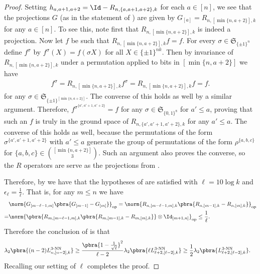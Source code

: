 \begin{proof}
    Setting $h_{a,a+1,a+2}=\Id-R_{n,\{a,a+1,a+2\},k}$ for each $a\in [n]$, we see that the projections $G$ (as in the statement of ) are given by $G_{[a]}=R_{n,[\min\{n,a+2\}],k}$ for any $a\in[n]$. To see this, note first that $R_{n,[\min\{n,a+2\}],k}$ is indeed a projection. Now let $f$ be such that $R_{n,[\min\{n,a+2\}],k}f=f$. For every $\sigma\in \mathfrak{S}_{\{\pm1\}^{n}}$ define $f^\sigma$ by $f^\sigma(X)=f(\sigma X)$ for all $X\in\{\pm1\}^{nk}$. Then by invariance of $R_{n,[\min\{n,a+2\}],k}$ under a permutation applied to bits in $[\min\{n,a+2\}]$ we have
    \begin{align*}
        f^\sigma = R_{n,[\min\{n,a+2\}],k}f^\sigma =R_{n,[\min\{n,a+2\}],k}f =f.
    \end{align*}
    for any $\sigma \in \mathfrak{S}_{\{\pm1\}^{[\min\{n,a+2\}]}}$. The converse of this holds as well by a similar argument. Therefore, $f^{\sigma^{\{a',a'+1,a'+2\}}} = f$ for any $\sigma\in \mathfrak{S}_{\{0,1\}^8}$ for $a'\leq a$, proving that such an $f$ is truly in the ground space of $R_{n,\{a',a'+1,a'+2\},k}$ for any $a'\leq a$. The converse of this holds as well, because the permutations of the form $\sigma^{\{a',a'+1,a'+2\}}$ with $a'\leq a$ generate the group of permutations of the form $\rho^{\{a,b,c\}}$ for $\{a,b,c\}\in\binom{[\min\{n,a+2\}]}{3}$. Such an argument also proves the converse, so the $R$ operators are serve as the projections from .
    
    Therefore, by  we have that the hypotheses of  are satisfied with $\ell=10\log k$ and $\epsilon_\ell = \frac1\ell$. That is, for any $m\leq n$ we have
    \begin{align*}
    &\norm{G_{[m-\ell-1,m]}\pbra{G_{[m-1]}-G_{[m]}}}_{\mathrm{op}}
        =\norm{R_{n,[m-\ell-1,m],k}\pbra{R_{n,[m-1],k}-R_{n,[m],k}}}_{\mathrm{op}}\\
        =&\norm{\pbra{R_{m,[m-\ell-1,m],k}\pbra{R_{m,[m-1],k}-R_{m,[m],k}}}\otimes \Id_{[m+1,n]}}_{\mathrm{op}}
        \leq \frac1\ell.
    \end{align*}
    Therefore the conclusion of  is that 
    \begin{align*}
        &\lambda_2\pbra{(n-2)L_{n,[n-2],k}^{3\text{-NN}}}
        \geq \frac{\pbra{1-\frac1{\sqrt\ell}}^2}{\ell-2}\lambda_2\pbra{\ell L_{\ell+2,[\ell-2],k}^{3\text{-NN}}}
        \geq \frac{1}{2}\lambda_2\pbra{L_{\ell+2,[\ell-2],k}^{3\text{-NN}}}.
    \end{align*}
    Recalling our setting of $\ell$ completes the proof. 
\end{proof}



